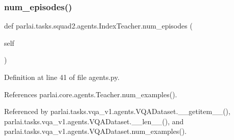 \subsubsection{\texorpdfstring{num\+\_\+episodes()}{num\_episodes()}}
{\footnotesize\ttfamily def parlai.\+tasks.\+squad2.\+agents.\+Index\+Teacher.\+num\+\_\+episodes (\begin{DoxyParamCaption}\item[{}]{self }\end{DoxyParamCaption})}



Definition at line 41 of file agents.\+py.



References parlai.\+core.\+agents.\+Teacher.\+num\+\_\+examples().



Referenced by parlai.\+tasks.\+vqa\+\_\+v1.\+agents.\+V\+Q\+A\+Dataset.\+\_\+\+\_\+getitem\+\_\+\+\_\+(), parlai.\+tasks.\+vqa\+\_\+v1.\+agents.\+V\+Q\+A\+Dataset.\+\_\+\+\_\+len\+\_\+\+\_\+(), and parlai.\+tasks.\+vqa\+\_\+v1.\+agents.\+V\+Q\+A\+Dataset.\+num\+\_\+examples().

